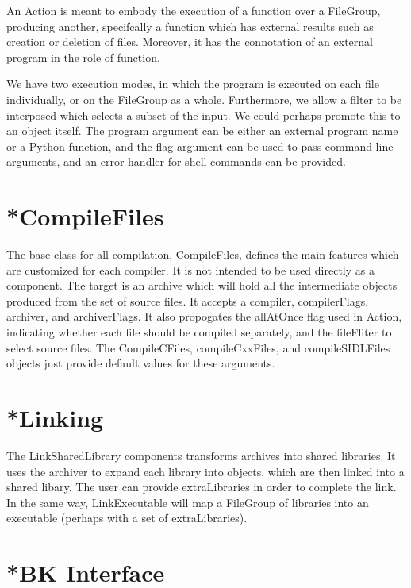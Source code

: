 An Action is meant to embody the execution of a function over a FileGroup, producing another, specifcally a function
which has external results such as creation or deletion of files. Moreover, it has the connotation of an external
program in the role of function.

We have two execution modes, in which the program is executed on each file individually, or on the FileGroup as a
whole. Furthermore, we allow a filter to be interposed which selects a subset of the input. We could perhaps promote
this to an object itself. The program argument can be either an external program name or a Python function, and the flag
argument can be used to pass command line arguments, and an error handler for shell commands can be provided.

\section{*CompileFiles}

The base class for all compilation, CompileFiles, defines the main features which are customized for each compiler. It
is not intended to be used directly as a component. The target is an archive which will hold all the intermediate
objects produced from the set of source files. It accepts a compiler, compilerFlags, archiver, and archiverFlags. It
also propogates the allAtOnce flag used in Action, indicating whether each file should be compiled separately, and the
fileFliter to select source files. The CompileCFiles, compileCxxFiles, and compileSIDLFiles objects just provide default
values for these arguments.

\section{*Linking}

The LinkSharedLibrary components transforms archives into shared libraries. It uses the archiver to expand each library
into objects, which are then linked into a shared libary. The user can provide extraLibraries in order to complete the
link. In the same way, LinkExecutable will map a FileGroup of libraries into an executable (perhaps with a set of
extraLibraries).

\section{*BK Interface}

